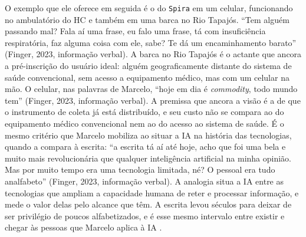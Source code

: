 O exemplo que ele oferece em seguida é o do \texttt{Spira} em um celular, funcionando no ambulatório do HC e também em uma barca no Rio Tapajós. \enquote{Tem alguém passando mal? Fala aí uma frase, eu falo uma frase, tá com insuficiência respiratória, faz alguma coisa com ele, sabe? Te dá um encaminhamento barato} (Finger, 2023, informação verbal). A barca no Rio Tapajós é o actante que ancora a pré-inscrição do usuário ideal: alguém geograficamente distante do sistema de saúde convencional, sem acesso a equipamento médico, mas com um celular na mão. O celular, nas palavras de Marcelo, \enquote{hoje em dia é \textit{commodity}, todo mundo tem} (Finger, 2023, informação verbal). A premissa que ancora a visão é a de que o instrumento de coleta já está distribuído, e seu custo não se compara ao do equipamento médico convencional nem ao do acesso ao sistema de saúde. É o mesmo critério que Marcelo mobiliza ao situar a IA na história das tecnologias, quando a compara à escrita: \enquote{a escrita tá aí até hoje, acho que foi uma bela e muito mais revolucionária que qualquer inteligência artificial na minha opinião. Mas por muito tempo era uma tecnologia limitada, né? O pessoal era tudo analfabeto} (Finger, 2023, informação verbal). A analogia situa a IA entre as tecnologias que ampliam a capacidade humana de reter e processar informação, e mede o valor delas pelo alcance que têm. A escrita levou séculos para deixar de ser privilégio de poucos alfabetizados, e é esse mesmo intervalo entre existir e chegar às pessoas que Marcelo aplica à IA \parencite{Latour2011CienciaEmAcao}.

